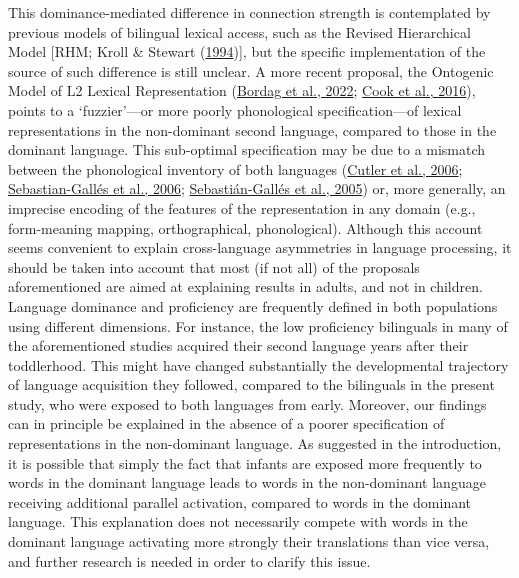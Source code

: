 \documentclass[
]{article}
\begin{document}
This dominance-mediated difference in connection strength is
contemplated by previous models of bilingual lexical access, such as the
Revised Hierarchical Model {[}RHM; Kroll \& Stewart
(\protect\hyperlink{ref-kroll1994category}{1994}){]}, but the specific
implementation of the source of such difference is still unclear. A more
recent proposal, the Ontogenic Model of L2 Lexical Representation
(\protect\hyperlink{ref-bordag2022ontogenesis}{Bordag et al., 2022};
\protect\hyperlink{ref-cook2016fuzzy}{Cook et al., 2016}), points to a
`fuzzier'---or more poorly phonological specification---of lexical
representations in the non-dominant second language, compared to those
in the dominant language. This sub-optimal specification may be due to a
mismatch between the phonological inventory of both languages
(\protect\hyperlink{ref-cutler2006asymmetric}{Cutler et al., 2006};
\protect\hyperlink{ref-sebastian2006first}{Sebastian-Gallés et al.,
2006}; \protect\hyperlink{ref-sebastian2005influence}{Sebastián-Gallés
et al., 2005}) or, more generally, an imprecise encoding of the features
of the representation in any domain (e.g., form-meaning mapping,
orthographical, phonological). Although this account seems convenient to
explain cross-language asymmetries in language processing, it should be
taken into account that most (if not all) of the proposals
aforementioned are aimed at explaining results in adults, and not in
children. Language dominance and proficiency are frequently defined in
both populations using different dimensions. For instance, the low
proficiency bilinguals in many of the aforementioned studies acquired
their second language years after their toddlerhood. This might have
changed substantially the developmental trajectory of language
acquisition they followed, compared to the bilinguals in the present
study, who were exposed to both languages from early. Moreover, our
findings can in principle be explained in the absence of a poorer
specification of representations in the non-dominant language. As
suggested in the introduction, it is possible that simply the fact that
infants are exposed more frequently to words in the dominant language
leads to words in the non-dominant language receiving additional
parallel activation, compared to words in the dominant language. This
explanation does not necessarily compete with words in the dominant
language activating more strongly their translations than vice versa,
and further research is needed in order to clarify this issue.
\end{document}
